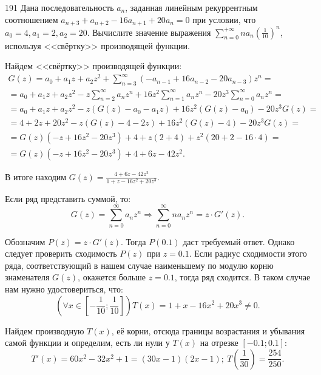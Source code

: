 \begin{task}{191}
Дана последовательность \(a_n\), заданная линейным рекуррентным соотношением \(a_{n+3}+a_{n+2}-16a_{n+1}+20a_n=0\) при условии, что \(a_0=4, a_1=2, a_2=20\). Вычислите значение выражения \(\sum_{n=0}^{+\infty}na_n\left(\frac{1}{10}\right)^n\), используя <<свёртку>> производящей функции.
\end{task}

\begin{solution}

Найдем <<свёртку>> производящей функции:
\begin{gather*}
    G(z) = a_0 + a_1z + a_2z^2 + \sum_{n=3}^{\infty} \left(-a_{n-1} + 16a_{n-2} - 20a_{n-3} \right)z^n = \\
    = a_0 + a_1z + a_2z^2 - z\sum_{n=2}^{\infty} a_nz^n + 16z^2\sum_{n=1}^{\infty} a_nz^n - 20z^3\sum_{n=0}^{\infty} a_nz^n = \\
    = a_0 + a_1z + a_2z^2 - z\left(G(z) - a_0 - a_1z \right) + 16z^2\left(G(z) - a_0 \right) - 20z^3G(z) = \\
    = 4 + 2z + 20z^2 - z\left(G(z) - 4 - 2z \right) + 16z^2\left(G(z) - 4 \right) - 20z^3G(z) = \\
    = G(z)(-z + 16z^2 - 20z^3) + 4 + z\left(2 + 4 \right) + z^2\left(20 + 2 - 16 \cdot 4 \right) = \\
    = G(z)(-z + 16z^2 - 20z^3) + 4 + 6z - 42z^2.
\end{gather*}

В итоге находим \(G(z) = \frac{4 + 6z - 42z^2}{1 + z - 16z^2 + 20z^3}\).

Если ряд представить суммой, то:
\begin{equation*}
    G(z) = \sum_{n=0}^{\infty} a_nz^n \Rightarrow \sum_{n=0}^{\infty} na_nz^n = z \cdot G'(z).
\end{equation*}

Обозначим \(P(z) = z \cdot G'(z)\). Тогда \(P(0.1)\) даст требуемый ответ. Однако следует проверить сходимость \(P(z)\) при \(z = 0.1\). Если радиус сходимости этого ряда, соответствующий в нашем случае наименьшему по модулю корню знаменателя \(G(z)\), окажется больше \(z = 0.1\), тогда ряд сходится. В таком случае нам нужно удостовериться, что:
\begin{equation*}
    \left(\forall x \in \left[-\frac{1}{10}; \frac{1}{10} \right] \right) T(x) = 1 + x - 16x^2 + 20x^3 \neq 0.
\end{equation*}

Найдем производную \(T(x)\), её корни, отсюда границы возрастания и убывания самой функции и определим, есть ли нули у \(T(x)\) на отрезке \([-0.1; 0.1]\):
\begin{equation*}
    T'(x) = 60x^2 - 32x^2 + 1 = (30x - 1)(2x - 1); \: T(\frac{1}{30}) = \frac{254}{250}.
\end{equation*}


\end{solution}
